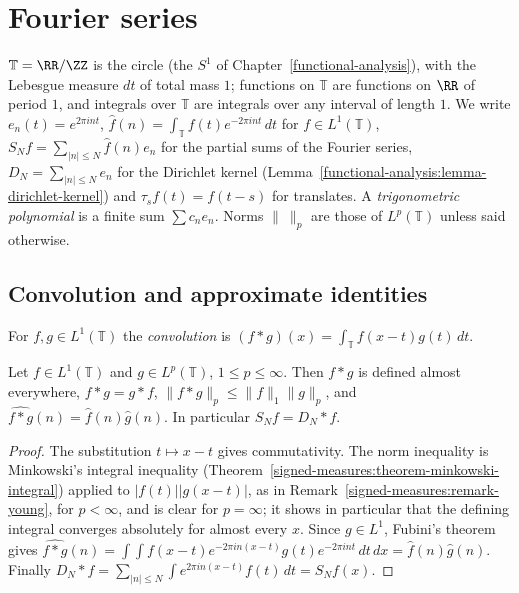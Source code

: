 \section{Fourier series}\label{harmonic-analysis:section-fourier-series}

\begin{notation}\label{harmonic-analysis:notation-circle}
$\mathbb{T} = \RR/\ZZ$ is the circle (the $S^1$ of Chapter~\ref{functional-analysis}), with the Lebesgue measure $dt$ of total mass $1$; functions on $\mathbb{T}$ are functions on $\RR$ of period $1$, and integrals over
$\mathbb{T}$ are integrals over any interval of length $1$. We write $e_n(t) = e^{2\pi int}$, $\hat f(n) = \int_\mathbb{T}f(t)e^{-2\pi int}\,dt$ for $f \in L^1(\mathbb{T})$, $S_Nf = \sum_{|n| \leq N}\hat f(n)e_n$ for the partial sums of
the Fourier series, $D_N = \sum_{|n| \leq N}e_n$ for the Dirichlet kernel (Lemma~\ref{functional-analysis:lemma-dirichlet-kernel}) and $\tau_sf(t) = f(t - s)$ for translates. A \emph{trigonometric polynomial} is a finite sum
$\sum c_ne_n$. Norms $\|\ \|_p$ are those of $L^p(\mathbb{T})$ unless said otherwise.
\end{notation}

\subsection{Convolution and approximate identities}\label{harmonic-analysis:subsection-convolution}

\begin{definition}\label{harmonic-analysis:definition-convolution-circle}
For $f, g \in L^1(\mathbb{T})$ the \emph{convolution} is $(f * g)(x) = \int_\mathbb{T}f(x - t)g(t)\,dt$.
\end{definition}

\begin{proposition}\label{harmonic-analysis:proposition-convolution-circle}
Let $f \in L^1(\mathbb{T})$ and $g \in L^p(\mathbb{T})$, $1 \leq p \leq \infty$. Then $f * g$ is defined almost everywhere, $f * g = g * f$, $\|f * g\|_p \leq \|f\|_1\|g\|_p$, and $\widehat{f * g}(n) = \hat f(n)\hat g(n)$.
In particular $S_Nf = D_N * f$.
\end{proposition}

\begin{proof}
The substitution $t \mapsto x - t$ gives commutativity. The norm inequality is Minkowski's integral inequality (Theorem~\ref{signed-measures:theorem-minkowski-integral}) applied to $|f(t)||g(x - t)|$, as in
Remark~\ref{signed-measures:remark-young}, for $p < \infty$, and is clear for $p = \infty$; it shows in particular that the defining integral converges absolutely for almost every $x$. Since $g \in L^1$, Fubini's theorem gives
$\widehat{f * g}(n) = \int\int f(x - t)e^{-2\pi in(x-t)}g(t)e^{-2\pi int}\,dt\,dx = \hat f(n)\hat g(n)$. Finally $D_N * f = \sum_{|n| \leq N}\int e^{2\pi in(x-t)}f(t)\,dt = S_Nf(x)$.
\end{proof}

